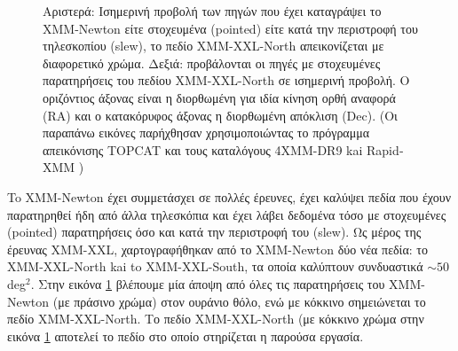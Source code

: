 \begin{figure}%
    \centering
    \qquad
     \caption{Αριστερά: Ισημερινή προβολή των πηγών που έχει καταγράψει το \textlatin{XMM-Newton} είτε στοχευμένα (\textlatin{pointed}) είτε κατά την περιστροφή του τηλεσκοπίου (\textlatin{slew}), το πεδίο \textlatin{XMM-XXL-North} απεικονίζεται με διαφορετικό χρώμα. Δεξιά: προβάλονται οι πηγές με στοχευμένες παρατηρήσεις του πεδίου \textlatin{XMM-XXL-North} σε ισημερινή προβολή. Ο οριζόντιος άξονας είναι η διορθωμένη για ιδία κίνηση ορθή αναφορά (\textlatin{RA}) και ο κατακόρυφος άξονας η διορθωμένη απόκλιση (\textlatin{Dec}). (Οι παραπάνω εικόνες παρήχθησαν χρησιμοποιώντας το πρόγραμμα απεικόνισης \textlatin{TOPCAT} \cite{TopCat} και τους καταλόγους \textlatin{4XMM-DR9}\cite{2020yCat.9059....0W} kai \textlatin{RapidXMM} \cite{RapidXMM})} \label{fig:XMMfield}
\end{figure}
  
To \textlatin{XMM-Νewton} έχει συμμετάσχει σε πολλές έρευνες, έχει καλύψει πεδία που έχουν παρατηρηθεί ήδη από άλλα τηλεσκόπια και έχει λάβει δεδομένα τόσο με στοχευμένες (\textlatin{pointed}) παρατηρήσεις όσο και κατά την περιστροφή του (\textlatin{slew}). Ως μέρος της έρευνας \textlatin{XMM-XXL}, χαρτογραφήθηκαν από το \textlatin{XMM-Νewton} δύο νέα πεδία: το \textlatin{XMM-XXL-North} kai to \textlatin{XMM-XXL-South}, τα οποία καλύπτουν συνδυαστικά $\sim 50 $ \textlatin{deg}$^2$. Στην εικόνα \ref{fig:XMMfield} βλέπουμε μία άποψη από όλες τις παρατηρήσεις του \textlatin{XMM-Νewton} (με πράσινο χρώμα) στον ουράνιο θόλο, ενώ με κόκκινο σημειώνεται το πεδίο \textlatin{XMM-XXL-North}. Το πεδίο \textlatin{XMM-XXL-North} (με κόκκινο χρώμα στην εικόνα \ref{fig:XMMfield} αποτελεί το πεδίο στο οποίο στηρίζεται η παρούσα εργασία.
  
  
  
  
  
  
  
  
  
  
